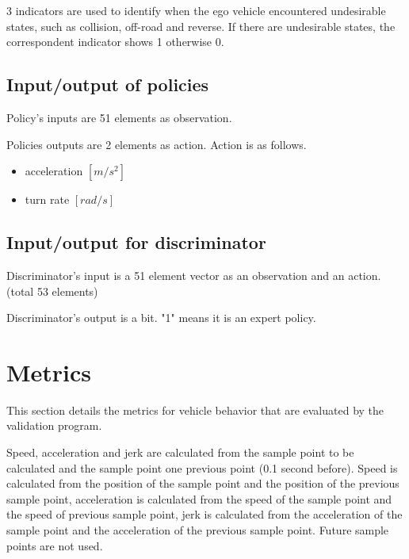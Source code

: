 3 indicators are used to identify when the ego vehicle encountered undesirable states, such as collision, off-road and reverse.
If there are undesirable states, the correspondent  indicator shows 1 otherwise 0.





\subsection{Input/output of policies}

Policy's inputs are 51 elements as observation.

Policies outputs are 2 elements as action.
Action is as follows.

\begin{itemize}
\item acceleration $[m/s^2]$
\item turn rate $[rad/s]$
\end{itemize}


\subsection{Input/output for discriminator}

Discriminator's input is a 51 element vector as an observation and an action. (total 53 elements)

Discriminator's output is a bit. "1" means it is an expert policy.



\section{Metrics}


This section details the metrics for vehicle behavior that are evaluated by the validation program.

Speed, acceleration and jerk are calculated from the sample point to be calculated and the sample point one previous point (0.1 second before).
Speed is calculated from the position of the sample point and the position of the previous sample point, acceleration is calculated from the speed of the sample point and the speed of previous sample point, jerk is calculated from the acceleration of the sample point and the acceleration of the previous sample point.
Future sample points are not used.

